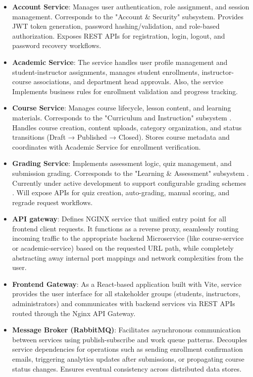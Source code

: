 \begin{itemize}
    \item \textbf{Account Service}: Manages user authentication, role assignment, and session management. 
    Corresponds to the "Account \& Security" subsystem. Provides JWT token generation, 
    password hashing/validation, and role-based authorization. Exposes REST APIs for registration, 
    login, logout, and password recovery workflows.
    
    \item \textbf{Academic Service}: The service handles user profile management and student-instructor assignments, 
    manages student enrollments, instructor-course associations, and department head approvals. Also, the service Implements business rules for 
    enrollment validation and progress tracking.
    
    \item \textbf{Course Service}: Manages course lifecycle, lesson content, and learning materials. 
    Corresponds to the "Curriculum and Instruction" subsystem . Handles course creation, 
    content uploads, category organization, and status transitions (Draft → Published → Closed). 
    Stores course metadata and coordinates with Academic Service for enrollment verification.
    
    \item \textbf{Grading Service}: Implements assessment logic, quiz management, and submission 
    grading. Corresponds to the "Learning \& Assessment" subsystem . Currently under 
    active development to support configurable grading schemes . Will expose 
    APIs for quiz creation, auto-grading, manual scoring, and regrade request workflows.
    
    \item \textbf{API gateway}: Defines NGINX service that unified entry point for all frontend 
    client requests. It functions as a reverse proxy, seamlessly routing incoming traffic to the appropriate 
    backend Microservice (like course-service or academic-service) based on the requested URL path, while completely 
    abstracting away internal port mappings and network complexities from the user.

    \item \textbf{Frontend Gateway}: As a React-based application built with Vite, service
    provides the user interface for all stakeholder groups (students, instructors, administrators)
    and communicates with backend services via REST APIs routed through the Nginx API Gateway. 
    
    \item \textbf{Message Broker (RabbitMQ)}: Facilitates asynchronous communication between services 
    using publish-subscribe and work queue patterns. Decouples service dependencies for operations 
    such as sending enrollment confirmation emails, triggering analytics updates after submissions, 
    or propagating course status changes. Ensures eventual consistency across distributed data stores.
\end{itemize}

